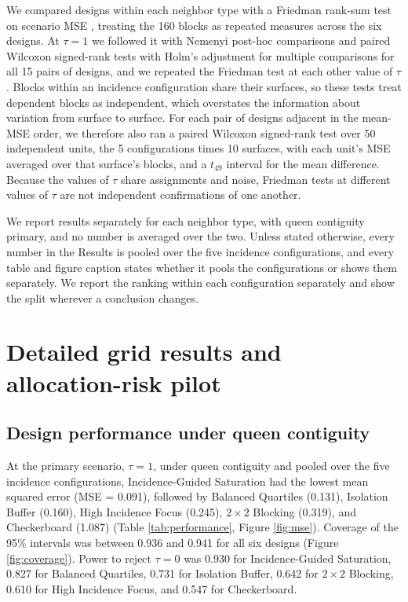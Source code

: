 \documentclass[11pt]{article}
\begin{document}
We compared designs within each neighbor type with a Friedman rank-sum
test on scenario MSE \citep{friedman_use_1937}, treating the 160 blocks
as repeated measures across the six designs. At \(\tau = 1\) we followed
it with Nemenyi post-hoc comparisons
\citep{nemenyi_distributionfree_1963, demsar_statistical_2006} and
paired Wilcoxon signed-rank tests \citep{wilcoxon_individual_1945} with
Holm's adjustment for multiple comparisons \citep{holm_simple_1979} for
all 15 pairs of designs, and we repeated the Friedman test at each other
value of \(\tau\). Blocks within an incidence configuration share their
surfaces, so these tests treat dependent blocks as independent, which
overstates the information about variation from surface to surface. For
each pair of designs adjacent in the mean-MSE order, we therefore also
ran a paired Wilcoxon signed-rank test over 50 independent units, the 5
configurations times 10 surfaces, with each unit's MSE averaged over
that surface's blocks, and a \(t_{49}\) interval for the mean
difference. Because the values of \(\tau\) share assignments and noise,
Friedman tests at different values of \(\tau\) are not independent
confirmations of one another.

We report results separately for each neighbor type, with queen
contiguity primary, and no number is averaged over the two. Unless
stated otherwise, every number in the Results is pooled over the five
incidence configurations, and every table and figure caption states
whether it pools the configurations or shows them separately. We report
the ranking within each configuration separately and show the split
wherever a conclusion changes.

\section{Detailed grid results and allocation-risk
pilot}\label{detailed-grid-results-and-allocation-risk-pilot}

\subsection{Design performance under queen
contiguity}\label{design-performance-under-queen-contiguity}

At the primary scenario, \(\tau = 1\), under queen contiguity and pooled
over the five incidence configurations, Incidence-Guided Saturation had the lowest mean squared error (MSE = 0.091), followed by
Balanced Quartiles (0.131), Isolation Buffer (0.160), High Incidence
Focus (0.245), \(2\times2\) Blocking (0.319), and Checkerboard (1.087)
(Table \ref{tab:performance}, Figure \ref{fig:mse}). Coverage of the
95\% intervals was between 0.936 and 0.941 for all six designs (Figure
\ref{fig:coverage}). Power to reject \(\tau = 0\) was 0.930 for
Incidence-Guided Saturation, 0.827 for Balanced Quartiles,
0.731 for Isolation Buffer, 0.642 for \(2\times2\) Blocking, 0.610 for
High Incidence Focus, and 0.547 for Checkerboard.
\end{document}
